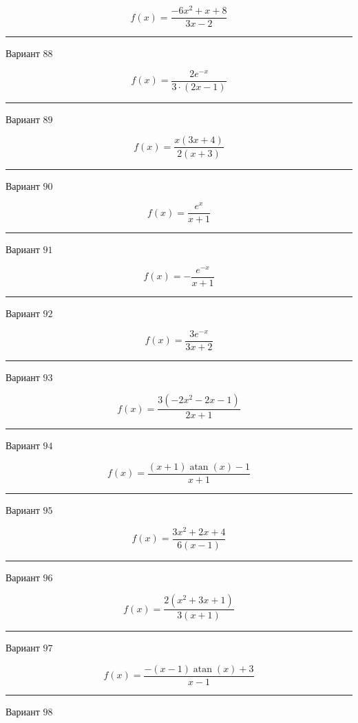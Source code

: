 \documentclass[11pt]{report}
\begin{document}
$$f(x) = \frac{- 6 x^{2} + x + 8}{3 x - 2}$$
\begin{center}
\noindent\rule{8cm}{0.4pt}
\end{center}
Вариант $88$


$$f(x) = \frac{2 e^{- x}}{3 \cdot \left(2 x - 1\right)}$$
\begin{center}
\noindent\rule{8cm}{0.4pt}
\end{center}
Вариант $89$


$$f(x) = \frac{x \left(3 x + 4\right)}{2 \left(x + 3\right)}$$
\begin{center}
\noindent\rule{8cm}{0.4pt}
\end{center}
Вариант $90$


$$f(x) = \frac{e^{x}}{x + 1}$$
\begin{center}
\noindent\rule{8cm}{0.4pt}
\end{center}
Вариант $91$


$$f(x) = - \frac{e^{- x}}{x + 1}$$
\begin{center}
\noindent\rule{8cm}{0.4pt}
\end{center}
Вариант $92$


$$f(x) = \frac{3 e^{- x}}{3 x + 2}$$
\begin{center}
\noindent\rule{8cm}{0.4pt}
\end{center}
Вариант $93$


$$f(x) = \frac{3 \left(- 2 x^{2} - 2 x - 1\right)}{2 x + 1}$$
\begin{center}
\noindent\rule{8cm}{0.4pt}
\end{center}
Вариант $94$


$$f(x) = \frac{\left(x + 1\right) \operatorname{atan}{\left(x \right)} - 1}{x + 1}$$
\begin{center}
\noindent\rule{8cm}{0.4pt}
\end{center}
Вариант $95$


$$f(x) = \frac{3 x^{2} + 2 x + 4}{6 \left(x - 1\right)}$$
\begin{center}
\noindent\rule{8cm}{0.4pt}
\end{center}
Вариант $96$


$$f(x) = \frac{2 \left(x^{2} + 3 x + 1\right)}{3 \left(x + 1\right)}$$
\begin{center}
\noindent\rule{8cm}{0.4pt}
\end{center}
Вариант $97$


$$f(x) = \frac{- \left(x - 1\right) \operatorname{atan}{\left(x \right)} + 3}{x - 1}$$
\begin{center}
\noindent\rule{8cm}{0.4pt}
\end{center}
Вариант $98$
\end{document}
